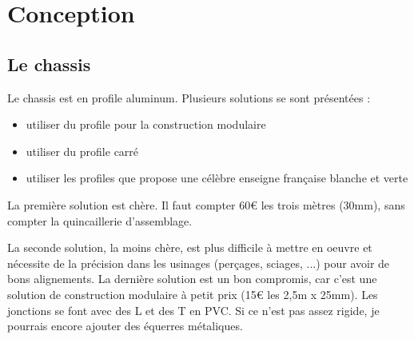 \section{Conception}
\subsection{Le chassis}
Le chassis est en profile aluminum. Plusieurs solutions se sont %
présentées :\begin{itemize}%
\item{utiliser du profile pour la construction modulaire}%
\item{utiliser du profile carré}%
\item{utiliser les profiles que propose une célèbre enseigne française %
blanche et verte}
\end{itemize}%
La première solution est chère. Il faut compter 60€ les trois mètres %
(30mm), sans compter la quincaillerie d'assemblage. \par%
La seconde solution, la moins chère, est plus difficile à mettre en %
oeuvre et nécessite de la précision dans les usinages (perçages, sciages, %
...) pour avoir de bons alignements.%
La dernière solution est un bon compromis, car c'est une solution de %
construction modulaire à petit prix (15€ les 2,5m x 25mm). Les jonctions %
se font avec des L et des T en PVC. Si ce n'est pas assez rigide, je %
pourrais encore ajouter des équerres métaliques.